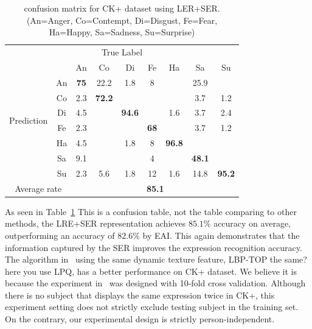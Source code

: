 \documentclass[journal]{IEEEtran}
\begin{document}
\begin{table}[htbp]
\caption{confusion matrix for CK+ dataset using LER+SER.
(An=Anger, Co=Contempt, Di=Disgust, Fe=Fear, Ha=Happy, Sa=Sadness, Su=Surprise)}
\begin{center}
\label{table:CK_result}
\begin{tabular}{c|c|ccccccc}

\multicolumn{9}{c}{True Label} \\ \cline{2-9}
\multirow{8}{*}{\begin{sideways}Prediction\end{sideways}} && An & Co & Di & Fe & Ha & Sa & Su \\ \cline{2-9}
&An          &\textbf{75} &22.2  &1.8  &8  &  &25.9 &  \\ \cline{2-2}
&Co       &2.3  &\textbf{72.2}  &   &   &  &3.7  &1.2 \\ \cline{2-2}
&Di        &4.5  &   &\textbf{94.6} &  &1.6 &3.7 &2.4  \\ \cline{2-2}
&Fe           &2.3   &   &   &\textbf{68} &  &3.7  &1.2  \\ \cline{2-2}
&Ha          &4.5   &   &1.8  &8 &\textbf{96.8} &  &  \\ \cline{2-2}
&Sa        &9.1  &  &  &4   &  &\textbf{48.1} & \\ \cline{2-2}
&Su       &2.3  &5.6 &1.8  &12 &1.6  &14.8 &\textbf{95.2} \\ \hline
\multicolumn{2}{c|}{Average rate} &\multicolumn{7}{c}{\textbf{85.1}} \\

\end{tabular}
\end{center}
\end{table}


\textcolor[rgb]{1,0,0}{As seen in Table~\ref{table:CK_result} This is a confusion table, not the table comparing to other methods}, the LRE+SER representation achieves $85.1\%$ accuracy on average, outperforming an accuracy of $82.6\%$ by EAI. This again demonstrates that the information captured by the SER improves the expression recognition accuracy. The algorithm in~\cite{Zhao_PAMI07} using the same dynamic texture feature, \textcolor[rgb]{1,0,0}{LBP-TOP the same? here you use LPQ}, has a better performance on CK+ dataset. We believe it is because the experiment in~\cite{Zhao_PAMI07} was designed with 10-fold cross validation. Although there is no subject that displays the same expression twice in CK+, this experiment setting does not strictly exclude testing subject in the training set. On the contrary, our experimental design is strictly person-independent.
\end{document}

